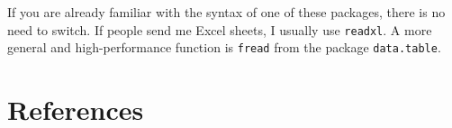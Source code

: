 \documentclass[
]{book}
\begin{document}
If you are already familiar with the syntax of one of these packages, there is no need to switch. If people send me Excel sheets, I usually use \texttt{readxl}. A more general and high-performance function is \texttt{fread} from the package \texttt{data.table}.

\hypertarget{references}{%
\chapter*{References}\label{references}}

  
\end{document}
